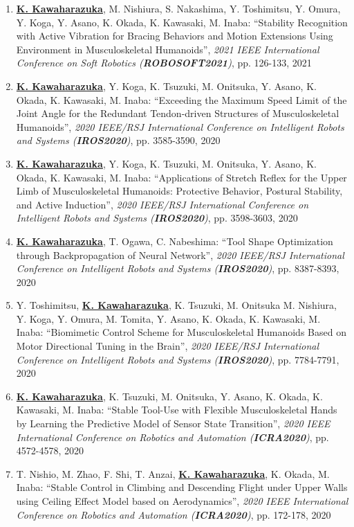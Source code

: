 \documentclass[letterpaper]{article}
\begin{document}
\begin{enumerate}
\item \underline{\textbf{K. Kawaharazuka}}, M. Nishiura, S. Nakashima, Y. Toshimitsu, Y. Omura, Y. Koga, Y. Asano, K. Okada, K. Kawasaki, M. Inaba: ``Stability Recognition with Active Vibration for Bracing Behaviors and Motion Extensions Using Environment in Musculoskeletal Humanoids'', \textit{2021 IEEE International Conference on Soft Robotics (\textit{\textbf{ROBOSOFT2021}})}, pp. 126-133, 2021
\item \underline{\textbf{K. Kawaharazuka}}, Y. Koga, K. Tsuzuki, M. Onitsuka, Y. Asano, K. Okada, K. Kawasaki, M. Inaba: ``Exceeding the Maximum Speed Limit of the Joint Angle for the Redundant Tendon-driven Structures of Musculoskeletal Humanoids'', \textit{2020 IEEE/RSJ International Conference on Intelligent Robots and Systems (\textit{\textbf{IROS2020}})}, pp. 3585-3590, 2020
\item \underline{\textbf{K. Kawaharazuka}}, Y. Koga, K. Tsuzuki, M. Onitsuka, Y. Asano, K. Okada, K. Kawasaki, M. Inaba: ``Applications of Stretch Reflex for the Upper Limb of Musculoskeletal Humanoids: Protective Behavior, Postural Stability, and Active Induction'', \textit{2020 IEEE/RSJ International Conference on Intelligent Robots and Systems (\textit{\textbf{IROS2020}})}, pp. 3598-3603, 2020
\item \underline{\textbf{K. Kawaharazuka}}, T. Ogawa, C. Nabeshima: ``Tool Shape Optimization through Backpropagation of Neural Network'', \textit{2020 IEEE/RSJ International Conference on Intelligent Robots and Systems (\textit{\textbf{IROS2020}})}, pp. 8387-8393, 2020
\item Y. Toshimitsu, \underline{\textbf{K. Kawaharazuka}}, K. Tsuzuki, M. Onitsuka M. Nishiura, Y. Koga, Y. Omura, M. Tomita, Y. Asano, K. Okada, K. Kawasaki, M. Inaba: ``Biomimetic Control Scheme for Musculoskeletal Humanoids Based on Motor Directional Tuning in the Brain'', \textit{2020 IEEE/RSJ International Conference on Intelligent Robots and Systems (\textit{\textbf{IROS2020}})}, pp. 7784-7791, 2020
\item \underline{\textbf{K. Kawaharazuka}}, K. Tsuzuki, M. Onitsuka, Y. Asano, K. Okada, K. Kawasaki, M. Inaba: ``Stable Tool-Use with Flexible Musculoskeletal Hands by Learning the Predictive Model of Sensor State Transition'', \textit{2020 IEEE International Conference on Robotics and Automation (\textit{\textbf{ICRA2020}})}, pp. 4572-4578, 2020
\item T. Nishio, M. Zhao, F. Shi, T. Anzai, \underline{\textbf{K. Kawaharazuka}}, K. Okada, M. Inaba: ``Stable Control in Climbing and Descending Flight under Upper Walls using Ceiling Effect Model based on Aerodynamics'', \textit{2020 IEEE International Conference on Robotics and Automation (\textit{\textbf{ICRA2020}})}, pp. 172-178, 2020

\end{enumerate}
\end{document}
